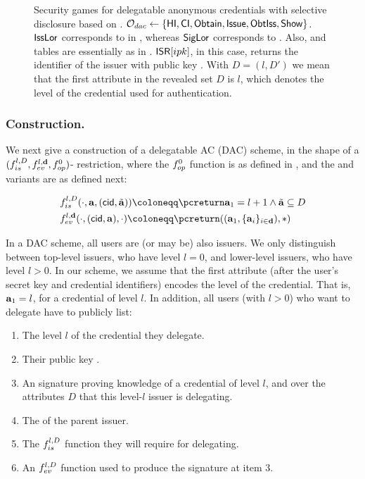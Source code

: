 \begin{figure}[ht!]
{  }
  \caption{Security games for delegatable anonymous credentials with selective
    disclosure based on \cite{fhs19}. $\mathcal{O}_{dac} \gets \lbrace
    \mathsf{HI},\mathsf{CI},\mathsf{Obtain},\mathsf{Issue},\mathsf{ObtIss},
    \mathsf{Show}\rbrace$. $\mathsf{IssLor}$ corresponds to \OBTCHALb in \UAS,
    whereas $\mathsf{SigLor}$ corresponds to \CHALb. Also, \OWNR
    and \ATTR tables are essentially as in .
    $\mathsf{ISR}[ipk]$, in this case, returns the identifier of the issuer with public
    key \ipk. With $D = (l,D')$ we mean that the first attribute in the revealed
    set $D$ is $l$, which denotes the level of the credential used for
    authentication.}
  \label{fig:model-dac}  
\end{figure}

\subsubsection{\CUASDAC Construction.} %
We next give a construction of a delegatable AC (DAC) scheme, in the shape of
a $(f_{is}^{l,D},f_{ev}^{l,\mathbf{d}},f_{op}^0)$-\CUASGenInt
restriction, where the $f_{op}^0$ function is as defined in
, and the \fissue and \feval variants are as
defined next:

\begin{align}
  & \fissue^{l,D}(\cdot,\attrs,(\cid,\cattrs)) \coloneqq
    \pcreturn \attrs_1 = l+1 \land \cattrs \subseteq D \nonumber \\
  & \feval^{l,\dattrs}(\cdot,(\cid,\attrs),\cdot) \coloneqq
    \pcreturn((\attrs_1,\lbrace\attrs_i\rbrace_{i\in\dattrs}),\ast)
    \label{eq:funcs-dac}
\end{align}

In a DAC scheme, all users are (or may be) also issuers. We only
distinguish between top-level issuers, who have level $l=0$, and lower-level
issuers, who have level $l>0$. In our \CUASDAC scheme, we assume that the first
attribute (after the user's secret key and credential identifiers) encodes the
level of the credential. That is, $\mathbf{a}_1=l$, for a credential of level $l$.
In addition, all users (with $l>0$) who want to delegate have to publicly
list:

\begin{enumerate}
\item The level $l$ of the credential they delegate.
\item Their public key \ipk.
\item An \UAS signature proving knowledge of a credential of level $l$, and over
  the attributes $D$ that this level-$l$ issuer is delegating.
\item The \ipk of the parent issuer.
\item The $f_{is}^{l,D}$ function they will require for delegating.
\item An $f_{ev}^{l,D}$ function used to produce the signature at item 3.
\end{enumerate}

